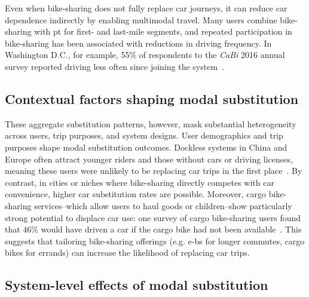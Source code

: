 Even when bike-sharing does not fully replace car journeys, it can reduce car dependence indirectly by enabling multimodal travel. Many users combine bike-sharing with \ac{pt} for first- and last-mile segments, and repeated participation in bike-sharing has been associated with reductions in driving frequency. In Washington D.C., for example, 55\% of respondents to the \textit{CaBi} 2016 annual survey reported driving less often since joining the system~\cite{NACTO2020}.

    \subsection{Contextual factors shaping modal substitution}

These aggregate substitution patterns, however, mask substantial heterogeneity across users, trip purposes, and system designs. User demographics and trip purposes shape modal substitution outcomes. Dockless systems in China and Europe often attract younger riders and those without cars or driving licenses, meaning these users were unlikely to be replacing car trips in the first place~\cite{Ma2020, Bosehans2024}. By contrast, in cities or niches where bike-sharing directly competes with car convenience, higher car substitution rates are possible. Moreover, cargo bike-sharing services--which allow users to haul goods or children--show particularly strong potential to displace car use: one survey of cargo bike-sharing users found that 46\% would have driven a car if the cargo bike had not been available~\cite{Becker2018}. This suggests that tailoring bike-sharing offerings (e.g. \acp{e-b} for longer commutes, cargo bikes for errands) can increase the likelihood of replacing car trips.

    \subsection{System-level effects of modal substitution}

